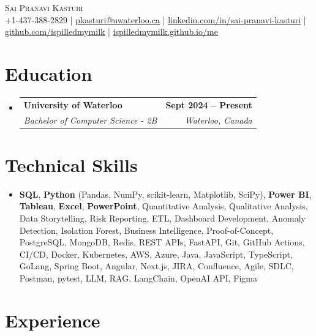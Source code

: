 \documentclass[letterpaper,10pt]{article}
\makeatletter
\newcommand{\resumeSubheading}[4]{
  \vspace{-1pt}\item
    \begin{tabular*}{1.0\textwidth}[t]{l@{\extracolsep{\fill}}r}
      \textbf{#1} & \textbf{\small #2} \\
      \textit{\small#3} & \textit{\small #4} \\[-2pt]
    \end{tabular*}\vspace{-7pt}
}
\newcommand{\resumeSubHeadingListStart}{\begin{itemize}[leftmargin=0.0in, label={}]}
\newcommand{\resumeSubHeadingListEnd}{\end{itemize}}
\makeatother
\begin{document}

\vspace{-28pt}
\begin{center}
    {\Huge \scshape Sai Pranavi Kasturi} \\ 
    
    \small +1-437-388-2829 | \underline{pkasturi@uwaterloo.ca} | \href{https://linkedin.com/in/sai-pranavi-kasturi-704807298}{\underline{linkedin.com/in/sai-pranavi-kasturi}} | \href{https://github.com/ispilledmymilk}{\underline{github.com/ispilledmymilk}} | \href{https://ispilledmymilk.github.io/me/}{\underline{ispilledmymilk.github.io/me}}
    \vspace{-10pt}
\end{center}

\vspace{-10pt}
\section{Education}
  \resumeSubHeadingListStart
    \resumeSubheading
      {University of Waterloo}{Sept 2024 -- Present}
      {Bachelor of Computer Science - 2B}{Waterloo, Canada}
  \resumeSubHeadingListEnd
\vspace{-8pt}


\section{Technical Skills}
\begin{itemize}[leftmargin=0.05in, label={}]
  \small\item{
    \textbf{SQL}, \textbf{Python} (Pandas, NumPy, scikit-learn, Matplotlib, SciPy), \textbf{Power BI}, \textbf{Tableau}, \textbf{Excel}, \textbf{PowerPoint}, Quantitative Analysis, Qualitative Analysis, Data Storytelling, Risk Reporting, ETL, Dashboard Development, Anomaly Detection, Isolation Forest, Business Intelligence, Proof-of-Concept, PostgreSQL, MongoDB, Redis, REST APIs, FastAPI, Git, GitHub Actions, CI/CD, Docker, Kubernetes, AWS, Azure, Java, JavaScript, TypeScript, GoLang, Spring Boot, Angular, Next.js, JIRA, Confluence, Agile, SDLC, Postman, pytest, LLM, RAG, LangChain, OpenAI API, Figma
  }
\end{itemize}
\vspace{-18pt}

\vspace{1.20pt}
\section{Experience}
\end{document}
